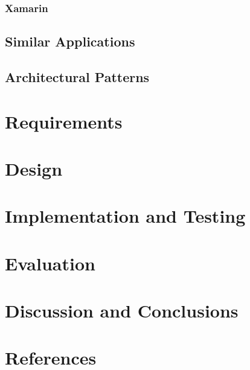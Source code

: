\documentclass[12pt]{report}
\begin{document}
			\subsection{Xamarin}{
			
			}
		\section{Similar Applications}
		\section{Architectural Patterns}
	\newpage

	\chapter{Requirements}

	\newpage	

	\chapter{Design}
	
	\newpage
	
	\chapter{Implementation and Testing}
	
	\newpage
	
	\chapter{Evaluation}
	
	\newpage
	
	\chapter{Discussion and Conclusions}
	
	\newpage	
	
	\chapter{References}
	
	\newpage
\end{document}
